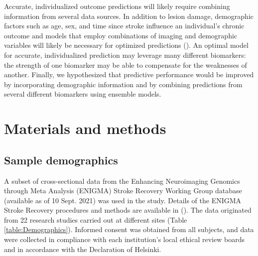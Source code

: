 \documentclass[10pt]{article}
\begin{document}
 Accurate, individualized outcome predictions will likely require combining information from several data sources. In addition to lesion damage, demographic factors such as age, sex, and time since stroke influence an individual's chronic outcome and models that employ combinations of imaging and demographic variables will likely be necessary for optimized predictions (\cite{Bonkhoff2022-op}). An optimal model for accurate, individualized prediction may leverage many different biomarkers: the strength of one biomarker may be able to compensate for the weaknesses of another. Finally, we hypothesized that predictive performance would be improved by incorporating demographic information and by combining predictions from several different biomarkers using ensemble models.

\section{Materials and methods}
\subsection{Sample demographics}
A subset of cross‐sectional data from the Enhancing Neuroimaging Genomics through Meta Analysis (ENIGMA) Stroke Recovery Working Group database (available as of 10 Sept. 2021) was used in the study. Details of the ENIGMA Stroke Recovery procedures and methods are available in (\cite{Liew2020-ps}). The data originated from 22 research studies carried out at different sites (Table \ref{table:Demographics}). Informed consent was obtained from all subjects, and data were collected in compliance with each institution’s local ethical review boards and in accordance with the Declaration of Helsinki.
\end{document}
